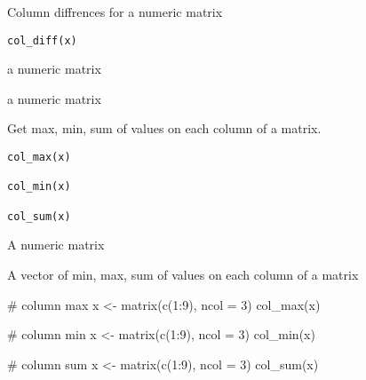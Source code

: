 \documentclass[letterpaper]{book}
\begin{document}
%
\begin{Description}
Column diffrences for a numeric matrix
\end{Description}
%
\begin{Usage}
\begin{verbatim}
col_diff(x)
\end{verbatim}
\end{Usage}
%
\begin{Arguments}
\begin{ldescription}
\item[\code{x}] a numeric matrix
\end{ldescription}
\end{Arguments}
%
\begin{Value}
a numeric matrix
\end{Value}
%
\begin{Description}
Get max, min, sum of values on each column of a matrix.
\end{Description}
%
\begin{Usage}
\begin{verbatim}
col_max(x)

col_min(x)

col_sum(x)
\end{verbatim}
\end{Usage}
%
\begin{Arguments}
\begin{ldescription}
\item[\code{x}] A numeric matrix
\end{ldescription}
\end{Arguments}
%
\begin{Value}
A vector of min, max, sum of values on each column of a matrix
\end{Value}
%
\begin{Examples}
\begin{ExampleCode}
# column max
x <- matrix(c(1:9), ncol = 3)
col_max(x)

# column min
x <- matrix(c(1:9), ncol = 3)
col_min(x)

# column sum
x <- matrix(c(1:9), ncol = 3)
col_sum(x)

\end{ExampleCode}
\end{Examples}
\end{document}
